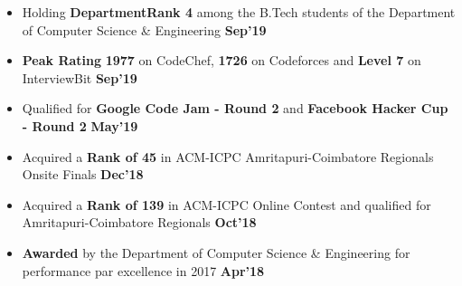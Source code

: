 \documentclass[10pt]{article}
\begin{document}
\vspace{-2ex}
\spacedhrule{0.15ex}{1.0ex}
\begin{itemize}[leftmargin=*]
\item Holding \textbf{DepartmentRank 4} among the B.Tech students of the Department of Computer Science \& Engineering {\hfill}\textbf{Sep'19}\\[-1.8em]
\item \textbf{Peak Rating} \textbf{1977} on CodeChef, \textbf{1726} on Codeforces and \textbf{Level 7} on InterviewBit \href{https://github.com/shmundhra/Credentials/tree/master/Competitive\%20Programming/Online\%20Judges\%20Profiles} {\hspace{0.5ex}\footnotesize\faMousePointer} {\hfill}\textbf{Sep'19}\\[-1.8em]
\item Qualified for \textbf{Google Code Jam - Round 2} and \textbf{Facebook Hacker Cup - Round 2} \href{https://github.com/shmundhra/Credentials/tree/master/Competitive\%20Programming/Google\%20CodeJam} {\hspace{1ex}\footnotesize\faMousePointer} \href{https://github.com/shmundhra/Credentials/tree/master/Competitive\%20Programming/Facebook\%20Hacker\%20Cup} {\hspace{0.5ex}\footnotesize\faMousePointer} {\hfill}\textbf{May'19}\\[-1.8em]
\item Acquired a \textbf{Rank of 45} in ACM-ICPC Amritapuri-Coimbatore Regionals Onsite Finals \href{https://github.com/shmundhra/Credentials/tree/master/Competitive\%20Programming/ACM\%20ICPC\%202018} {\hspace{0.5ex}\footnotesize\faMousePointer} {\hfill}\textbf{Dec'18}\\[-1.8em]
\item Acquired a \textbf{Rank of 139} in ACM-ICPC Online Contest and qualified for Amritapuri-Coimbatore Regionals \href{https://github.com/shmundhra/Credentials/tree/master/Competitive\%20Programming/ACM\%20ICPC\%202018} {\hspace{0.5ex}\footnotesize\faMousePointer} {\hfill}\textbf{Oct'18}\\[-1.8em]
\item \textbf{Awarded} by the Department of Computer Science \& Engineering for performance par excellence in 2017 \href{https://github.com/shmundhra/Credentials/tree/master/Scholarships} {\hspace{0.5ex}\footnotesize\faMousePointer} {\hfill}\textbf{Apr'18}\\[-1.8em]

\end{itemize}
\end{document}
